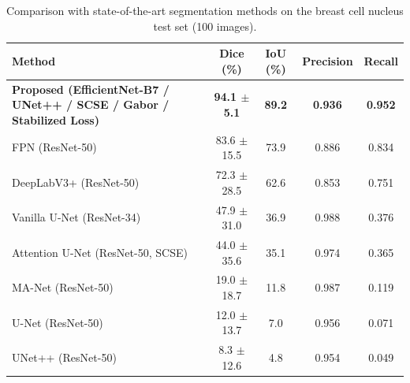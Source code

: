 \begin{table}[t]
\centering
\caption{Comparison with state-of-the-art segmentation methods on the breast cell nucleus test set (100 images).}
\label{tab:sota}
\begin{tabular}{lcccc}
\toprule
Method & Dice (\%) & IoU (\%) & Precision & Recall \\
\midrule
\textbf{Proposed (EfficientNet-B7 / UNet++ / SCSE / Gabor / Stabilized Loss)} & \textbf{94.1 $\pm$ 5.1} & \textbf{89.2} & \textbf{0.936} & \textbf{0.952} \\
FPN (ResNet-50) & 83.6 $\pm$ 15.5 & 73.9 & 0.886 & 0.834 \\
DeepLabV3+ (ResNet-50) & 72.3 $\pm$ 28.5 & 62.6 & 0.853 & 0.751 \\
Vanilla U-Net (ResNet-34) & 47.9 $\pm$ 31.0 & 36.9 & 0.988 & 0.376 \\
Attention U-Net (ResNet-50, SCSE) & 44.0 $\pm$ 35.6 & 35.1 & 0.974 & 0.365 \\
MA-Net (ResNet-50) & 19.0 $\pm$ 18.7 & 11.8 & 0.987 & 0.119 \\
U-Net (ResNet-50) & 12.0 $\pm$ 13.7 & 7.0 & 0.956 & 0.071 \\
UNet++ (ResNet-50) & 8.3 $\pm$ 12.6 & 4.8 & 0.954 & 0.049 \\
\bottomrule
\end{tabular}
\end{table}